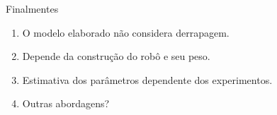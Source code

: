 \begin{frame}[t]{Finalmentes}
    \transdissolve[duration=0.5]
    \begin{enumerate}
      \item O modelo elaborado não considera derrapagem.
      \item Depende da construção do robô e seu peso.
      \item Estimativa dos parâmetros dependente dos experimentos.
      \item Outras abordagens?
    \end{enumerate}
  
\end{frame}